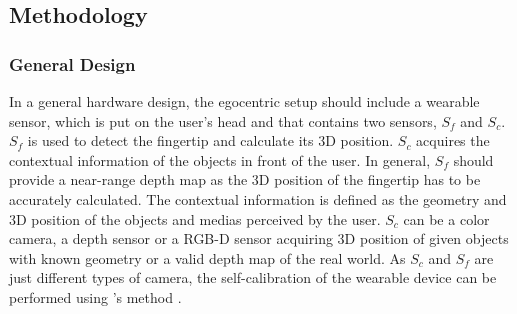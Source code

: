 \subsection{Methodology} \label{Methodology}
\subsubsection{General Design} \label{sec:4:generalDesign}
In a general hardware design, the egocentric setup should include a wearable sensor, which is put on the user's head and that contains two sensors, $S_{f}$ and $S_{c}$. $S_f$ is used to detect the fingertip and calculate its 3D position. $S_c$ acquires the contextual information of the objects in front of the user. In general, $S_f$ should provide a near-range depth map as the 3D position of the fingertip has to be accurately calculated. 
{The contextual information is defined as the geometry and 3D position of the objects and medias perceived by the user.} $S_c$ can be a color camera, a depth sensor or a RGB-D sensor acquiring 3D position of given objects with known geometry or a valid depth map of the real world. 
As $S_{c}$ and $S_{f}$ are just different types of camera, the self-calibration of the wearable device can be performed using \citeauthor{Zhang2000}{\rq}s method \cite{Zhang2000}.

